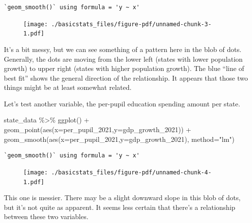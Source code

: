 \documentclass[
  letterpaper,
  DIV=11,
  numbers=noendperiod]{scrreprt}
\newenvironment{Shaded}{\begin{snugshade}}{\end{snugshade}}
\newcommand{\AttributeTok}[1]{\textcolor[rgb]{0.40,0.45,0.13}{#1}}
\newcommand{\FunctionTok}[1]{\textcolor[rgb]{0.28,0.35,0.67}{#1}}
\newcommand{\NormalTok}[1]{\textcolor[rgb]{0.00,0.23,0.31}{#1}}
\newcommand{\SpecialCharTok}[1]{\textcolor[rgb]{0.37,0.37,0.37}{#1}}
\newcommand{\StringTok}[1]{\textcolor[rgb]{0.13,0.47,0.30}{#1}}
\begin{document}
\begin{verbatim}
`geom_smooth()` using formula = 'y ~ x'
\end{verbatim}

\begin{figure}[H]

{\centering \texttt{[image: ./basicstats\_files/figure-pdf/unnamed-chunk-3-1.pdf]}

}

\end{figure}

It's a bit messy, but we can see something of a pattern here in the blob
of dots. Generally, the dots are moving from the lower left (states with
lower population growth) to upper right (states with higher population
growth). The blue ``line of best fit'' shows the general direction of
the relationship. It appears that those two things might be at least
somewhat related.

Let's test another variable, the per-pupil education spending amount per
state.

\begin{Shaded}
\begin{Highlighting}[]
\NormalTok{state\_data }\SpecialCharTok{\%\textgreater{}\%}
  \FunctionTok{ggplot}\NormalTok{() }\SpecialCharTok{+}
  \FunctionTok{geom\_point}\NormalTok{(}\FunctionTok{aes}\NormalTok{(}\AttributeTok{x=}\NormalTok{per\_pupil\_2021,}\AttributeTok{y=}\NormalTok{gdp\_growth\_2021)) }\SpecialCharTok{+}
  \FunctionTok{geom\_smooth}\NormalTok{(}\FunctionTok{aes}\NormalTok{(}\AttributeTok{x=}\NormalTok{per\_pupil\_2021,}\AttributeTok{y=}\NormalTok{gdp\_growth\_2021), }\AttributeTok{method=}\StringTok{"lm"}\NormalTok{)}
\end{Highlighting}
\end{Shaded}

\begin{verbatim}
`geom_smooth()` using formula = 'y ~ x'
\end{verbatim}

\begin{figure}[H]

{\centering \texttt{[image: ./basicstats\_files/figure-pdf/unnamed-chunk-4-1.pdf]}

}

\end{figure}

This one is messier. There may be a slight downward slope in this blob
of dots, but it's not quite as apparent. It seems less certain that
there's a relationship between these two variables.
\end{document}

